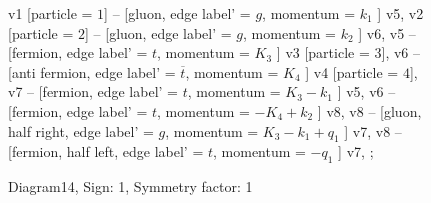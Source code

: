 \documentclass{revtex4}
\begin{document}
\begin{figure}[!htb]
\begin{center}
{    %
v1 [particle = \(1\)] -- [gluon, edge label' = \(g\), momentum = \(k_{1}\) ] v5, 
v2 [particle = \(2\)] -- [gluon, edge label' = \(g\), momentum = \(k_{2}\) ] v6, 
v5 -- [fermion, edge label' = \(t\), momentum = \(K_{3}\) ] v3 [particle = \(3\)], 
v6 -- [anti fermion, edge label' = \(\overline{t}\), momentum = \(K_{4}\) ] v4 [particle = \(4\)], 
v7 -- [fermion, edge label' = \(t\), momentum = \(K_{3} - k_{1}\) ] v5, 
v6 -- [fermion, edge label' = \(t\), momentum = \(-K_{4} + k_{2}\) ] v8, 
v8 -- [gluon, half right, edge label' = \(g\), momentum = \(K_{3} - k_{1} + q_{1}\) ] v7, 
v8 -- [fermion, half left, edge label' = \(t\), momentum = \(-q_{1}\) ] v7, 
};
\end{center}
\caption{Diagram14, Sign: 1, Symmetry factor: 1}
\end{figure}
\newpage
\end{document}
